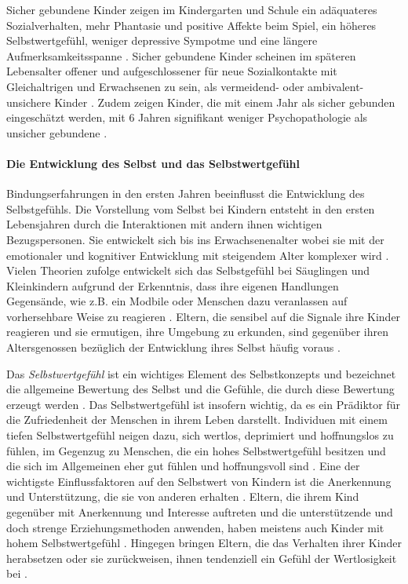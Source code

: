 Sicher gebundene Kinder zeigen im Kindergarten und Schule ein adäquateres Sozialverhalten, mehr Phantasie und positive Affekte beim Spiel, ein höheres Selbstwertgefühl, weniger depressive Sympotme und eine längere Aufmerksamkeitsspanne \cite{Dornes1993, Zeanah1994}. Sicher gebundene Kinder scheinen im späteren Lebensalter offener und aufgeschlossener für neue Sozialkontakte mit Gleichaltrigen und Erwachsenen zu sein, als vermeidend- oder ambivalent-unsichere Kinder \cite{Resch1999}. Zudem zeigen Kinder, die mit einem Jahr als sicher gebunden eingeschätzt werden, mit 6 Jahren signifikant weniger Psychopathologie als unsicher gebundene \cite{Lewis1984}.

\paragraph{Die Entwicklung des Selbst und das Selbstwertgefühl}\label{par:EntwSelbst}
Bindungserfahrungen in den ersten Jahren beeinflusst die Entwicklung des Selbstgefühls. Die Vorstellung vom Selbst bei Kindern entsteht in den ersten Lebensjahren durch die Interaktionen mit andern ihnen wichtigen Bezugspersonen. Sie entwickelt sich bis ins Erwachsenenalter wobei sie mit der emotionaler und kognitiver Entwicklung mit steigendem Alter komplexer wird \cite[S.~602ff]{Siegler2008}. Vielen Theorien zufolge entwickelt sich das Selbstgefühl bei Säuglingen und Kleinkindern aufgrund der Erkenntnis, dass ihre eigenen Handlungen Gegensände, wie z.B. ein Modbile oder Menschen dazu veranlassen auf vorhersehbare Weise zu reagieren \cite{Harter1998}. Eltern, die sensibel auf die Signale ihre Kinder reagieren und sie ermutigen, ihre Umgebung zu erkunden, sind gegenüber ihren Altersgenossen bezüglich der Entwicklung ihres Selbst häufig voraus \cite{Pipp1992}. 

Das \textit{Selbstwertgefühl} ist ein wichtiges Element des Selbstkonzepts und bezeichnet die allgemeine Bewertung des Selbst und die Gefühle, die durch diese Bewertung erzeugt werden \cite{Crocker2001}. Das Selbstwertgefühl ist insofern wichtig, da es ein Prädiktor für die Zufriedenheit der Menschen in ihrem Leben darstellt. Individuen mit einem tiefen Selbstwertgefühl neigen dazu, sich wertlos, deprimiert und hoffnungslos zu fühlen, im Gegenzug zu Menschen, die ein hohes Selbstwertgefühl besitzen und die sich im Allgemeinen eher gut fühlen und hoffnungsvoll sind \cite{Harter1999}. Eine der wichtigste Einflussfaktoren auf den Selbstwert von Kindern ist die Anerkennung und Unterstützung, die sie von anderen erhalten \cite{Siegler2008}. Eltern, die ihrem Kind gegenüber mit Anerkennung und Interesse auftreten und die unterstützende und doch strenge Erziehungsmethoden anwenden, haben meistens auch Kinder mit hohem Selbstwertgefühl \cite{Feiring1996}. Hingegen bringen Eltern, die das Verhalten ihrer Kinder herabsetzen oder sie zurückweisen, ihnen tendenziell ein Gefühl der Wertlosigkeit bei \cite{Harter1999}. 

